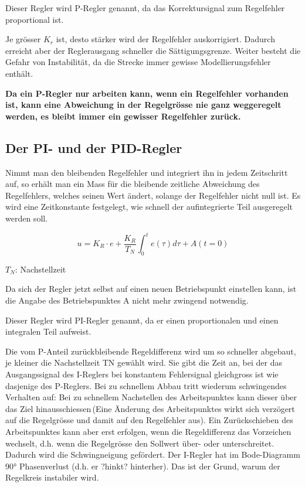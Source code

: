 \documentclass[a4paper,10pt,oneside]{article}
\begin{document}
Dieser Regler wird P-Regler genannt, da das Korrektursignal zum Regelfehler proportional ist.

Je grösser $K_r$ ist, desto stärker wird der Regelfehler auskorrigiert. Dadurch erreicht aber der Reglerausgang schneller die Sättigungsgrenze. Weiter besteht die Gefahr von Instabilität, da die Strecke immer gewisse Modellierungsfehler enthält.

\textbf{Da ein P-Regler nur arbeiten kann, wenn ein Regelfehler vorhanden ist, kann eine Abweichung in der Regelgrösse nie ganz weggeregelt werden, es bleibt immer ein gewisser Regelfehler zurück.}

\subsection{Der PI- und der PID-Regler}
Nimmt man den bleibenden Regelfehler und integriert ihn in jedem Zeitschritt auf, so erhält man ein Mass für die bleibende zeitliche Abweichung des Regelfehlers, welches seinen Wert ändert, solange der Regelfehler nicht null ist. 
Es wird eine Zeitkonstante festgelegt, wie schnell der aufintegrierte Teil ausgeregelt werden soll.

\begin{equation}
u= K_R \cdot e + \frac{K_R}{T_N} \int_{0}^{t} e(\tau)d\tau + A(t=0)
\end{equation}

$T_N$: Nachstellzeit

Da sich der Regler jetzt selbst auf einen neuen Betriebspunkt einstellen kann, ist die Angabe des Betriebspunktes A nicht mehr zwingend notwendig.

Dieser Regler wird PI-Regler genannt, da er einen proportionalen und einen integralen Teil aufweist.

Die vom P-Anteil zurückbleibende Regeldifferenz wird um so schneller abgebaut, je kleiner die Nachstellzeit TN gewählt wird. Sie gibt die Zeit an, bei der das Ausgangssignal des I-Reglers bei konstantem Fehlersignal gleichgross ist wie dasjenige des P-Reglers. Bei zu schnellem Abbau tritt wiederum schwingendes Verhalten auf: Bei zu schnellem Nachstellen des Arbeitspunktes kann dieser über das Ziel \grqq hinausschiessen\grqq  \,(Eine Änderung des Arbeitspunktes wirkt sich verzögert auf die Regelgrösse und damit auf den Regelfehler aus). Ein Zurückschieben des Arbeitspunktes kann aber erst erfolgen, wenn die Regeldifferenz das Vorzeichen wechselt, d.h. wenn die Regelgrösse den Sollwert über- oder unterschreitet. Dadurch wird die Schwingneigung gefördert. Der I-Regler hat im Bode-Diagramm 90° Phasenverlust (d.h. er ?hinkt? hinterher). Das ist der Grund, warum der Regelkreis instabiler wird. 
\end{document}
